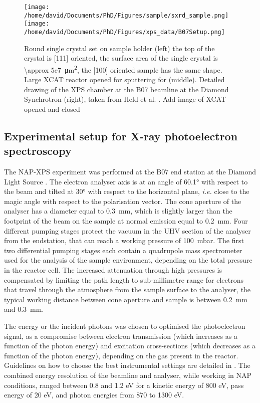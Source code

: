 \begin{figure}[!htb]
    \centering
    \texttt{[image: /home/david/Documents/PhD/Figures/sample/sxrd\_sample.png]}
    \texttt{[image: /home/david/Documents/PhD/Figures/xps\_data/B07Setup.png]}
    \caption{
        Round single crystal set on sample holder (left) the top of the crystal is [111] oriented, the surface area of the single crystal is \qty{\approx 5e7}{\um^2}, the [100] oriented sample has the same shape.
        Large XCAT reactor opened for sputtering for (middle).
        Detailed drawing of the XPS chamber at the B07 beamline at the Diamond Synchrotron (right), taken from Held et al. \parencite*{Held2020}.
        \textcolor{Important}{Add image of XCAT opened and closed}
    }
    \label{fig:SampleSXRD}
\end{figure}

\subsection{Experimental setup for X-ray photoelectron spectroscopy} \label{sec:XPS111}

The NAP-XPS experiment was performed at the B07 end station at the Diamond Light Source \parencite{Held2020}.
The electron analyser axis is at an angle of \ang{60.1} with respect to the beam and tilted at \ang{30} with respect to the horizontal plane, \textit{i.e.} close to the magic angle with respect to the polarisation vector.
The cone aperture of the analyser has a diameter equal to \qty{0.3}{\mm}, which is slightly larger than the footprint of the beam on the sample at normal emission equal to \qty{0.2}{\mm}.
Four different pumping stages protect the vacuum in the UHV section of the analyser from the endstation, that can reach a working pressure of \qty{100}{\milli\bar}.
The ﬁrst two differential pumping stages each contain a quadrupole mass spectrometer used for the analysis of the sample environment, depending on the total pressure in the reactor cell.
The increased attenuation through high pressures is compensated by limiting the path length to sub-millimetre range for electrons that travel through the atmosphere from the sample surface to the analyser, the typical working distance between cone aperture and sample is between \qty{0.2}{\mm} and \qty{0.3}{\mm}.

The energy or the incident photons was chosen to optimised the photoelectron signal, as a compromise between electron transmission (which increases as a function of the photon energy) and excitation cross-sections (which decreases as a function of the photon energy), depending on the gas present in the reactor.
Guidelines on how to choose the best instrumental settings are detailed in \parencite{Held2020}.
The combined energy resolution of the beamline and analyser, while working in NAP conditions, ranged between 0.8 and 1.2 eV for a kinetic energy of 800 eV, pass energy of 20 eV, and photon energies from 870 to 1300 eV.
